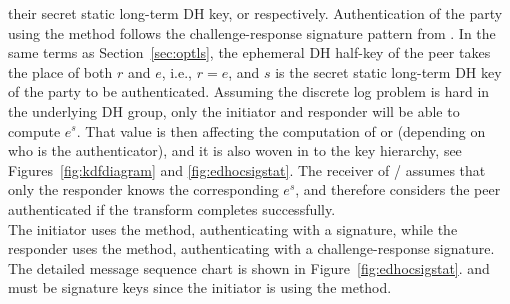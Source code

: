 their secret static long-term DH key, \mLtki{} or \mLtkr{} respectively.
%
Authentication of the party using the \mStat{} method follows the
challenge-response signature pattern from \mOptls.
%
In the same terms as Section~\ref{sec:optls}, the ephemeral DH half-key of the
peer takes the place of both $r$ and $e$, i.e., $r=e$, and $s$ is the secret
static long-term DH key of the party to be authenticated.
%
Assuming the discrete log problem is hard in the underlying DH group,
only the initiator and responder will be able to compute $e^s$.
%
That value is then affecting the computation of \mAuthr{} or \mAuthi{}
(depending on who is the authenticator), and it is also
woven in to the key hierarchy, see
Figures~\ref{fig:kdfdiagram} and \ref{fig:edhocsigstat}.
%
The receiver of \mAuthi{}/\mAuthr{} assumes that only the responder knows
the corresponding $e^s$, and therefore considers the peer authenticated if
the \mAead{} transform completes successfully.\\
%
%
 
\runhead{\mSigStat}
The initiator uses the \mSig{} method, authenticating with a signature,
while the responder uses the \mStat{} method, authenticating with a
challenge-response signature.
%
The detailed message sequence chart is shown in Figure~\ref{fig:edhocsigstat}.
%
\mCredi{} and \mLtki{} must be signature keys since the initiator is using the
\mSig{} method. \\
%

